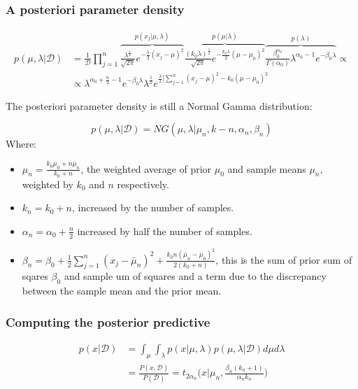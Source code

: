 		\subsubsection{A posteriori parameter density}

		\begin{align*}
			p(\mu, \lambda|\mathcal{D})& = \frac{1}{\mathcal{D}}\prod\limits_{j=1}^n\overbrace{\frac{\lambda^{\frac{1}{2}}}{\sqrt{2\pi}}e^{-\frac{\lambda}{2}(x_j-\mu)^2}}^{p(x_j|\mu, \lambda)}\overbrace{\frac{(k_0\lambda)^{\frac{1}{2}}}{\sqrt{2\pi}}e^{-\frac{k_0\lambda}{2}(\mu-\mu_0)^2}}^{p(\mu|\lambda)}\overbrace{\frac{\beta^{\alpha_0}_0}{\Gamma(\alpha_0)}\lambda^{\alpha_0-1}e^{-\beta_0\lambda}}^{p(\lambda)}\propto\\
									&\propto \lambda^{\alpha_0+\frac{n}{2}-1}e^{-\beta_0\lambda}\lambda^{\frac{1}{2}}e^{\frac{\lambda}{2}[\sum\limits_{j=1}^n(x_j-\mu)^2-k_0(\mu-\mu_0)^2}
		\end{align*}

		The posteriori parameter density is still a Normal Gamma distribution:

		$$p(\mu, \lambda|\mathcal{D}) = NG(\mu, \lambda|\mu_n, k-n, \alpha_n, \beta_n)$$
		Where:

		\begin{itemize}
			\item $\mu_n = \frac{k_0\mu_0+n\bar{\mu}_n}{k_0+n}$, the weighted average of prior $\mu_0$ and sample means $\mu_n$, weighted by $k_0$ and $n$ respectively.
			\item $k_n = k_0+n$, increased by the number of samples.
			\item $\alpha_n = \alpha_0 + \frac{n}{2}$ increased by half the number of samples.
			\item $\beta_n = \beta_0+\frac{1}{2}\sum\limits_{j=1}^n(x_j-\bar{\mu}_n)^2+\frac{k_0n(\bar{\mu}_n-\mu_0)^2}{2(k_0+n)}$, this is the sum of prior sum of sqares $\beta_0$ and sample um of squares and a term due to the discrepancy between the sample mean and the prior mean.
		\end{itemize}

		\subsubsection{Computing the posterior predictive}

		\begin{align*}
			p(x|\mathcal{D}) &= \int_\mu\int_\lambda p(x|\mu, \lambda)p(\mu, \lambda|\mathcal{D})d\mu d\lambda\\
											&=\frac{P(x, \mathcal{D})}{P(\mathcal{D})} = t_{2\alpha_n}\biggl(x|\mu_n, \frac{\beta_n(k_n+1)}{\alpha_n k_n}\biggr)
		\end{align*}

